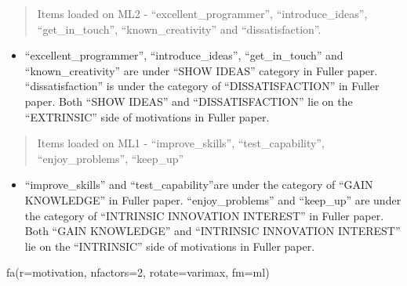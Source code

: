 \documentclass[
]{article}
\newenvironment{Shaded}{\begin{snugshade}}{\end{snugshade}}
\newcommand{\AttributeTok}[1]{\textcolor[rgb]{0.77,0.63,0.00}{#1}}
\newcommand{\DecValTok}[1]{\textcolor[rgb]{0.00,0.00,0.81}{#1}}
\newcommand{\FunctionTok}[1]{\textcolor[rgb]{0.00,0.00,0.00}{#1}}
\newcommand{\NormalTok}[1]{#1}
\newcommand{\StringTok}[1]{\textcolor[rgb]{0.31,0.60,0.02}{#1}}
\providecommand{\tightlist}{%
  \setlength{\itemsep}{0pt}\setlength{\parskip}{0pt}}
\begin{document}
\begin{quote}
Items loaded on ML2 - ``excellent\_programmer'', ``introduce\_ideas'',
``get\_in\_touch'', ``known\_creativity'' and ``dissatisfaction''.
\end{quote}

\begin{itemize}
\tightlist
\item
  ``excellent\_programmer'', ``introduce\_ideas'', ``get\_in\_touch''
  and ``known\_creativity'' are under ``SHOW IDEAS'' category in Fuller
  paper. ``dissatisfaction'' is under the category of
  ``DISSATISFACTION'' in Fuller paper. Both ``SHOW IDEAS'' and
  ``DISSATISFACTION'' lie on the ``EXTRINSIC'' side of motivations in
  Fuller paper.
\end{itemize}

\begin{quote}
Items loaded on ML1 - ``improve\_skills'', ``test\_capability'',
``enjoy\_problems'', ``keep\_up''
\end{quote}

\begin{itemize}
\tightlist
\item
  ``improve\_skills'' and ``test\_capability''are under the category of
  ``GAIN KNOWLEDGE'' in Fuller paper. ``enjoy\_problems'' and
  ``keep\_up'' are under the category of ``INTRINSIC INNOVATION
  INTEREST'' in Fuller paper. Both ``GAIN KNOWLEDGE'' and ``INTRINSIC
  INNOVATION INTEREST'' lie on the ``INTRINSIC'' side of motivations in
  Fuller paper.
\end{itemize}

\begin{Shaded}
\begin{Highlighting}[]
\FunctionTok{fa}\NormalTok{(}\AttributeTok{r=}\NormalTok{motivation, }\AttributeTok{nfactors=}\DecValTok{2}\NormalTok{, }\AttributeTok{rotate=}\StringTok{\textquotesingle{}varimax\textquotesingle{}}\NormalTok{, }\AttributeTok{fm=}\StringTok{\textquotesingle{}ml\textquotesingle{}}\NormalTok{)}
\end{Highlighting}
\end{Shaded}
\end{document}
